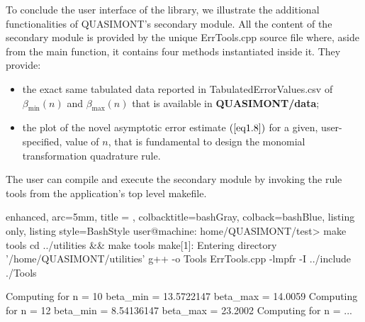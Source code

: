 \documentclass[a4paper, twosided]{book}
\begin{document}
\noindent
To conclude the user interface of the library, we illustrate the additional functionalities of QUASIMONT's secondary module. All the content of the secondary module is provided by the unique \colorbox{poliGrayBlue}{ErrTools.cpp} source file where, aside from the \colorbox{poliGrayBlue}{main} function, it contains four methods instantiated inside it. They provide:
\begin{itemize}
    \item the exact same tabulated data reported in \colorbox{poliGrayBlue}{TabulatedErrorValues.csv} of $\beta_{\text{min}}(n)$ and $\beta_{\text{max}}(n)$ that is available in \colorbox{poliGrayBlue}{\textbf{QUASIMONT/data}};
    \item the plot of the novel asymptotic error estimate $(\ref{eq1.8})$ for a given, user-specified, value of $n$, that is fundamental to design the monomial transformation quadrature rule. \color{black} 
\end{itemize}

\noindent
The user can compile and execute the secondary module by invoking the rule \colorbox{poliGrayBlue}{tools} from the application's top level \colorbox{poliGrayBlue}{makefile}.

\vspace{0.25cm}
\begin{tcblisting}{enhanced,
                   arc=5mm,
                   title = \color{black}{\large \ttfamily Compilation and execution of QUASIMONT's secondary module},
                   colbacktitle=bashGray,
                   colback=bashBlue,
                   listing only,
                   listing style=BashStyle}
user@machine: home/QUASIMONT/test> make tools
cd ../utilities && make tools
make[1]: Entering directory '/home/QUASIMONT/utilities'
g++ -o Tools ErrTools.cpp -lmpfr -I ../include
./Tools

Computing for n = 10
    beta_min = 13.5722147
    beta_max = 14.0059
Computing for n = 12
    beta_min = 8.54136147
    beta_max = 23.2002
Computing for n = ...
\end{tcblisting}
\end{document}
